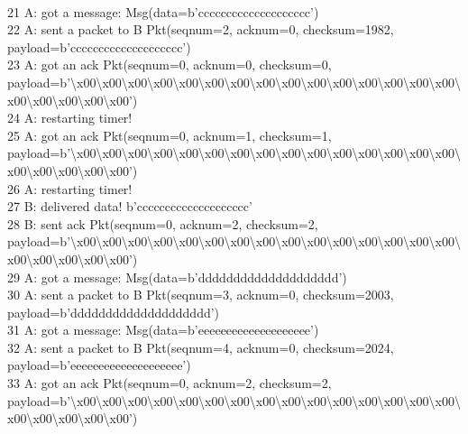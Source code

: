 \documentclass{article}
\begin{document}
{\\
21 A: got a message: Msg(data=b'cccccccccccccccccccc') \\
22 A: sent a packet to B Pkt(seqnum=2, acknum=0, checksum=1982,
payload=b'cccccccccccccccccccc') \\
23 A: got an ack Pkt(seqnum=0, acknum=0, checksum=0,
payload=b'\textbackslash{}x00\textbackslash{}x00\textbackslash{}x00\textbackslash{}x00\textbackslash{}x00\textbackslash{}x00\textbackslash{}x00\textbackslash{}x00\textbackslash{}x00\textbackslash{}x00\textbackslash{}x00\textbackslash{}x00\textbackslash{}x00\textbackslash{}x00\textbackslash{}x00\textbackslash{}x00\textbackslash{}x00\textbackslash{}x00\textbackslash{}x00\textbackslash{}x00')
\\
24 A: restarting timer! \\
25 A: got an ack Pkt(seqnum=0, acknum=1, checksum=1,
payload=b'\textbackslash{}x00\textbackslash{}x00\textbackslash{}x00\textbackslash{}x00\textbackslash{}x00\textbackslash{}x00\textbackslash{}x00\textbackslash{}x00\textbackslash{}x00\textbackslash{}x00\textbackslash{}x00\textbackslash{}x00\textbackslash{}x00\textbackslash{}x00\textbackslash{}x00\textbackslash{}x00\textbackslash{}x00\textbackslash{}x00\textbackslash{}x00\textbackslash{}x00')
\\
26 A: restarting timer! \\
27 B: delivered data! b'cccccccccccccccccccc' \\
28 B: sent ack Pkt(seqnum=0, acknum=2, checksum=2,
payload=b'\textbackslash{}x00\textbackslash{}x00\textbackslash{}x00\textbackslash{}x00\textbackslash{}x00\textbackslash{}x00\textbackslash{}x00\textbackslash{}x00\textbackslash{}x00\textbackslash{}x00\textbackslash{}x00\textbackslash{}x00\textbackslash{}x00\textbackslash{}x00\textbackslash{}x00\textbackslash{}x00\textbackslash{}x00\textbackslash{}x00\textbackslash{}x00\textbackslash{}x00')
\\
29 A: got a message: Msg(data=b'dddddddddddddddddddd') \\
30 A: sent a packet to B Pkt(seqnum=3, acknum=0, checksum=2003,
payload=b'dddddddddddddddddddd') \\
31 A: got a message: Msg(data=b'eeeeeeeeeeeeeeeeeeee') \\
32 A: sent a packet to B Pkt(seqnum=4, acknum=0, checksum=2024,
payload=b'eeeeeeeeeeeeeeeeeeee') \\
33 A: got an ack Pkt(seqnum=0, acknum=2, checksum=2,
payload=b'\textbackslash{}x00\textbackslash{}x00\textbackslash{}x00\textbackslash{}x00\textbackslash{}x00\textbackslash{}x00\textbackslash{}x00\textbackslash{}x00\textbackslash{}x00\textbackslash{}x00\textbackslash{}x00\textbackslash{}x00\textbackslash{}x00\textbackslash{}x00\textbackslash{}x00\textbackslash{}x00\textbackslash{}x00\textbackslash{}x00\textbackslash{}x00\textbackslash{}x00')
}
\end{document}
